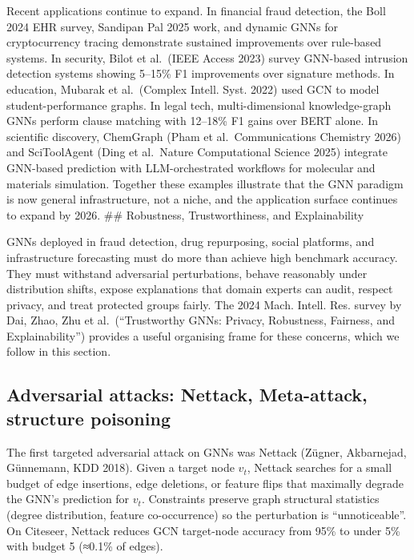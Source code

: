 Recent applications continue to expand. In financial fraud detection, the Boll 2024 EHR survey, Sandipan Pal 2025 work, and dynamic GNNs for cryptocurrency tracing demonstrate sustained improvements over rule-based systems. In security, Bilot et al.~(IEEE Access 2023) survey GNN-based intrusion detection systems showing 5--15\% F1 improvements over signature methods. In education, Mubarak et al.~(Complex Intell. Syst. 2022) used GCN to model student-performance graphs. In legal tech, multi-dimensional knowledge-graph GNNs perform clause matching with 12--18\% F1 gains over BERT alone. In scientific discovery, ChemGraph (Pham et al.~Communications Chemistry 2026) and SciToolAgent (Ding et al.~Nature Computational Science 2025) integrate GNN-based prediction with LLM-orchestrated workflows for molecular and materials simulation. Together these examples illustrate that the GNN paradigm is now general infrastructure, not a niche, and the application surface continues to expand by 2026.
\#\# Robustness, Trustworthiness, and Explainability

GNNs deployed in fraud detection, drug repurposing, social platforms, and infrastructure forecasting must do more than achieve high benchmark accuracy. They must withstand adversarial perturbations, behave reasonably under distribution shifts, expose explanations that domain experts can audit, respect privacy, and treat protected groups fairly. The 2024 Mach. Intell. Res. survey by Dai, Zhao, Zhu et al.~(``Trustworthy GNNs: Privacy, Robustness, Fairness, and Explainability'') provides a useful organising frame for these concerns, which we follow in this section.

\subsection{Adversarial attacks: Nettack, Meta-attack, structure poisoning}\label{adversarial-attacks-nettack-meta-attack-structure-poisoning}

The first targeted adversarial attack on GNNs was Nettack (Zügner, Akbarnejad, Günnemann, KDD 2018). Given a target node \(v_t\), Nettack searches for a small budget of edge insertions, edge deletions, or feature flips that maximally degrade the GNN's prediction for \(v_t\). Constraints preserve graph structural statistics (degree distribution, feature co-occurrence) so the perturbation is ``unnoticeable''. On Citeseer, Nettack reduces GCN target-node accuracy from 95\% to under 5\% with budget 5 (≈0.1\% of edges).

